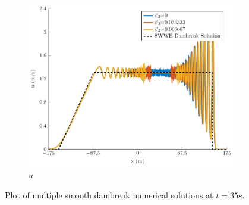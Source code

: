 \documentclass[10pt]{elsarticle}
\begin{document}
\begin{figure}
\begin{subfigure}{0.32\textwidth}
	\includegraphics[width=\textwidth]{./Figures/Simulations/Study/ImpDisp/u.pdf}
	\caption{$u$}
	\end{subfigure}
	\caption{Plot of multiple smooth dambreak numerical solutions at $t=35s$.}
\end{figure}
\end{document}
